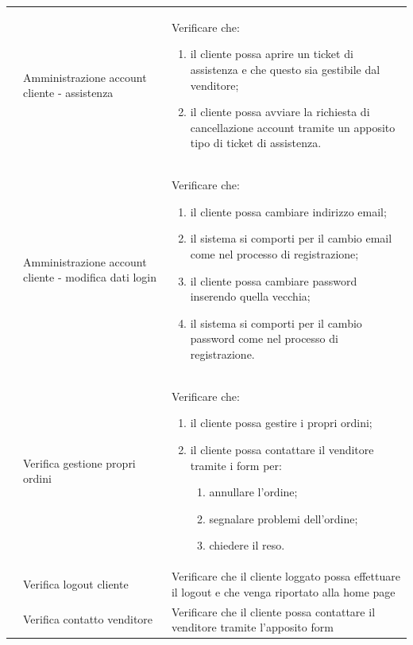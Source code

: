 \begin{center}
\begin{longtable}{|p{1cm}|p{4.85cm}|p{9cm}|}
		 & Amministrazione account cliente - assistenza & Verificare che:
		\begin{enumerate}
			\item il cliente possa aprire un ticket di assistenza e che questo sia gestibile dal venditore;
			\item il cliente possa avviare la richiesta di cancellazione account tramite un apposito tipo di ticket di assistenza.
		\end{enumerate} \\

		 & Amministrazione account cliente - modifica dati login & Verificare che:
		\begin{enumerate}
			\item il cliente possa cambiare indirizzo email;
			\item il sistema si comporti per il cambio email come nel processo di registrazione;
			\item il cliente possa cambiare password inserendo quella vecchia;
			\item il sistema si comporti per il cambio password come nel processo di registrazione. 
		\end{enumerate} \\

		 & Verifica gestione propri ordini & Verificare che:
		\begin{enumerate}
			\item il cliente possa gestire i propri ordini;
			\item il cliente possa contattare il venditore tramite i form per:
			\begin{enumerate}
				\item annullare l'ordine;
				\item segnalare problemi dell'ordine;
				\item chiedere il reso.
			\end{enumerate}
		\end{enumerate} \\

		 & Verifica logout cliente & Verificare che il cliente loggato possa effettuare il logout e che venga riportato alla home page \\

		 & Verifica contatto venditore & Verificare che il cliente possa contattare il venditore tramite l'apposito form  \\


\end{longtable}
\end{center}

